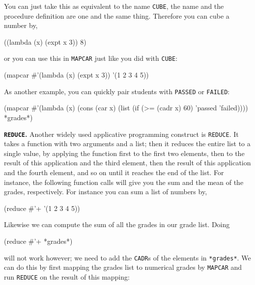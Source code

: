\documentclass[a4paper,11pt]{article}
\begin{document}
\begin{uenum}
You can just take this as equivalent to the name \Verb+CUBE+, the name and the procedure definition are one and the same thing. Therefore you can cube a number by,

\begin{lispcode}
((lambda (x) (expt x 3)) 8)
\end{lispcode}

or you can use this in \Verb+MAPCAR+ just like you did with \Verb+CUBE+:

\begin{lispcode}
(mapcar #'(lambda (x) (expt x 3)) '(1 2 3 4 5))
\end{lispcode}

\begin{uenumi}
\item As another example, you can quickly pair students with \Verb+PASSED+ or \Verb+FAILED+: 

\begin{lispcode}
(mapcar
  #'(lambda (x)
      (cons (car x)
            (list (if (>= (cadr x) 60) 'passed 'failed))))
  *grades*)
\end{lispcode}

\end{uenumi}

\item {\bf \Verb+REDUCE+.} Another widely used applicative programming construct is \Verb+REDUCE+. It takes a function with two arguments and a list; then it reduces the entire list to a single value, by applying the function first to the first two elements, then to the result of this application and the third element, then the result of this application and the fourth element, and so on until it reaches the end of the list. For instance, the following function calls will give you the sum and the mean of the grades, respectively. For instance you can sum a list of numbers by,

\begin{lispcode}
(reduce #'+ '(1 2 3 4 5))
\end{lispcode}

Likewise we can compute the sum of all the grades in our grade list. Doing

\begin{lispcode}
(reduce #'+ *grades*)
\end{lispcode}

will not work however; we need to add the \Verb+CADR+s of the elements in \Verb+*grades*+. We can do this by first mapping the grades list to numerical grades by \Verb+MAPCAR+ and run \Verb+REDUCE+ on the result of this mapping:


\end{uenum}
\end{document}
